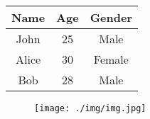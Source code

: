 \documentclass{article}
\begin{document}
\begin{table}[h!]
\centering
\begin{tabular}{|c|c|c|}
\hline
Name & Age & Gender \\
\hline
John & 25 & Male \\
\hline
Alice & 30 & Female \\
\hline
Bob & 28 & Male \\
\hline
\end{tabular}
\end{table}

\begin{figure}[h!]
\centering
\texttt{[image: ./img/img.jpg]}
\end{figure}
\end{document}
